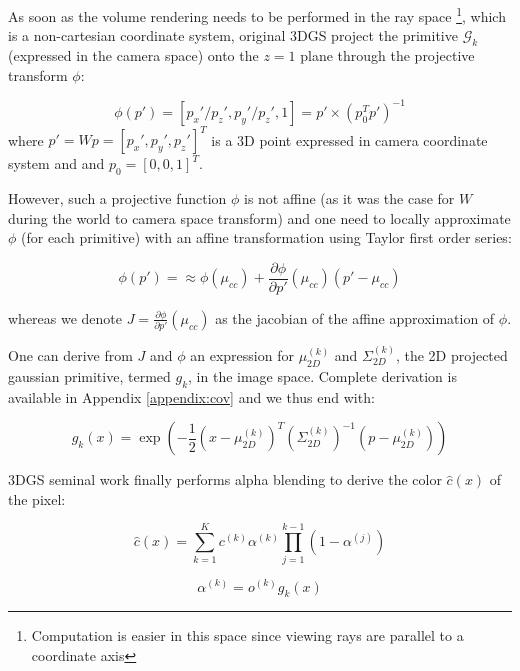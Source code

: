 As soon as the volume rendering needs to be performed in the ray space \footnote{Computation is easier in this space since viewing rays are parallel to a coordinate axis}, which is a non-cartesian coordinate system, original 3D\ac{GS} project the primitive $\mathcal{G}_{k}$ (expressed in the camera space) onto the $z=1$ plane through the projective transform $\phi$: 

\begin{equation}
  \phi(p') = [p_{x}'/p_{z}',p_{y}'/p_{z}',1] = p'\times(p_{0}^{T}p')^{-1}
\end{equation}
where $p'=Wp = [p_{x}',p_{y}',p_{z}']^{T}$ is a 3D point expressed in camera coordinate system and and $p_{0} = [0, 0, 1]^{T}$. \newline

However, such a projective function $\phi$ is not affine (as it was the case for $W$ during the world to camera space transform) and one need to locally approximate $\phi$ (for each primitive) with an affine transformation using Taylor first order series: 

\begin{equation}
  \label{eq:affine_transform}
  \phi(p') = \approx \phi(\mu_{cc}) + \frac{\partial \phi}{\partial p'}(\mu_{cc})(p' - \mu_{cc})
\end{equation}

whereas we denote $J = \frac{\partial \phi}{\partial p'}(\mu_{cc})$ as the jacobian of the affine approximation of $\phi$. 

One can derive from $J$ and $\phi$ an expression for $\mu^{(k)}_{2D}$ and $\Sigma^{(k)}_{2D}$, the 2D projected gaussian primitive, termed  $g_{k}$, in the image space. Complete derivation is available in Appendix \ref{appendix:cov} and we thus end with: 

\begin{equation}
  g_{k}(x) = \exp(-\frac{1}{2}(x-\mu^{(k)}_{2D})^{T}(\Sigma^{(k)}_{2D})^{-1}(p-\mu^{(k)}_{2D}))
\end{equation}

3D\ac{GS} seminal work \citep{kerbl20233d} finally performs alpha blending to derive the color $\hat{c}(x)$ of the pixel: 

\begin{equation}
\label{eq:gs-alpha-blending}
  \hat{c}(x) = \sum_{k=1}^{K}c^{(k)}\alpha^{(k)}\prod_{j=1}^{k-1}(1-\alpha^{(j)})
\end{equation}

\begin{equation}
\label{eq:gs-alpha-def}
  \alpha^{(k)} = o^{(k)}g_{k}(x)
\end{equation}

